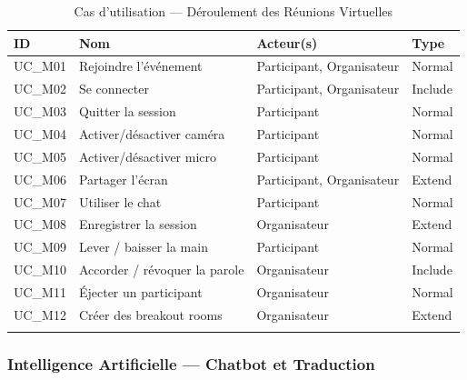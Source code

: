 \begin{longtable}{|m{1.5cm}|m{5cm}|m{4cm}|m{2cm}|}
\hline
\textbf{ID} & \textbf{Nom} & \textbf{Acteur(s)} & \textbf{Type} \\
\hline
\endhead
\endfoot
\endlastfoot
\hline
UC\_M01 & Rejoindre l'événement & Participant, Organisateur & Normal \\
\hline
UC\_M02 & Se connecter & Participant, Organisateur & Include \\
\hline
UC\_M03 & Quitter la session & Participant & Normal \\
\hline
UC\_M04 & Activer/désactiver caméra & Participant & Normal \\
\hline
UC\_M05 & Activer/désactiver micro & Participant & Normal \\
\hline
UC\_M06 & Partager l'écran & Participant, Organisateur & Extend \\
\hline
UC\_M07 & Utiliser le chat & Participant & Normal \\
\hline
UC\_M08 & Enregistrer la session & Organisateur & Extend \\
\hline
UC\_M09 & Lever / baisser la main & Participant & Normal \\
\hline
UC\_M10 & Accorder / révoquer la parole & Organisateur & Include \\
\hline
UC\_M11 & Éjecter un participant & Organisateur & Normal \\
\hline
UC\_M12 & Créer des breakout rooms & Organisateur & Extend \\
\hline
\captionsetup{justification=centering,margin=2cm}
\caption{Cas d'utilisation — Déroulement des Réunions Virtuelles}
\label{tab:uc_meetings}
\end{longtable}

\subsubsection{Intelligence Artificielle — Chatbot et Traduction}

